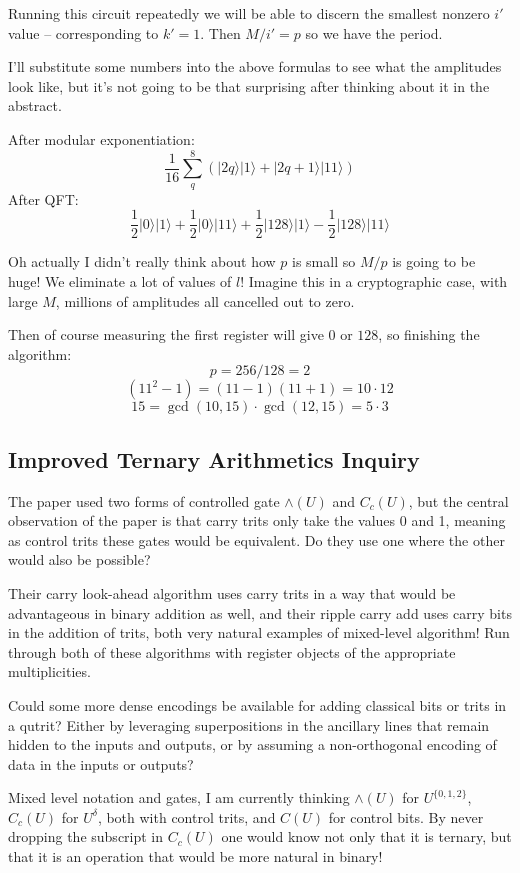 \documentclass[]{article}
\newcommand{\ket}[1]{| #1 \rangle}
\begin{document}
Running this circuit repeatedly we will be able to discern the smallest nonzero $i'$ value -- corresponding to $k'=1$. Then $M/i'=p$ so we have the period.

I'll substitute some numbers into the above formulas to see what the amplitudes look like, but it's not going to be that surprising after thinking about it in the abstract.

After modular exponentiation:
\[\frac{1}{16}\sum_q^{8}\left(\ket{2q}\ket{1}+\ket{2q+1}\ket{11}\right)\]
After QFT:
\[\frac{1}{2}\ket{0}\ket{1}+\frac{1}{2}\ket{0}\ket{11}+\frac{1}{2}\ket{128}\ket{1}-\frac{1}{2}\ket{128}\ket{11}\]

Oh actually I didn't really think about how $p$ is small so $M/p$ is going to be huge! We eliminate a lot of values of $l$! Imagine this in a cryptographic case, with large $M$, millions of amplitudes all cancelled out to zero.

Then of course measuring the first register will give $0$ or $128$, so finishing the algorithm:
\[p = 256/128 = 2\]
\[(11^2-1)=(11-1)(11+1)=10 \cdot 12\]
\[15 = \gcd(10,15)\cdot\gcd(12,15)=5\cdot3\]

\subsection{Improved Ternary Arithmetics Inquiry}

The paper used two forms of controlled gate $\wedge(U)$ and $C_c(U)$, but the central observation of the paper is that carry trits only take the values 0 and 1, meaning as control trits these gates would be equivalent. Do they use one where the other would also be possible?

Their carry look-ahead algorithm uses carry trits in a way that would be advantageous in binary addition as well, and their ripple carry add uses carry bits in the addition of trits, both very natural examples of mixed-level algorithm! Run through both of these algorithms with register objects of the appropriate multiplicities.

Could some more dense encodings be available for adding classical bits or trits in a qutrit? Either by leveraging superpositions in the ancillary lines that remain hidden to the inputs and outputs, or by assuming a non-orthogonal encoding of data in the inputs or outputs?

Mixed level notation and gates, I am currently thinking $\wedge(U)$ for $U^{\{0,1,2\}}$, $C_c(U)$ for $U^\delta$, both with control trits, and $C(U)$ for control bits. By never dropping the subscript in $C_c(U)$ one would know not only that it is ternary, but that it is an operation that would be more natural in binary!
\end{document}
